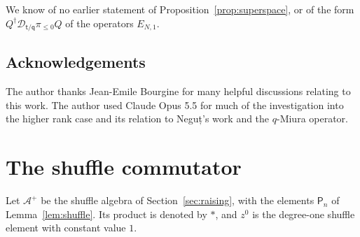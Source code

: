 \documentclass[11pt]{amsart}
\theoremstyle{definition}
\theoremstyle{remark}
\newcommand{\Mq}{\mathsf q}                      %
\newcommand{\Mt}{\mathsf t}                      %
\newcommand{\DD}{\mathcal D}
\newcommand{\Twist}[1]{\DD_{#1}}                 %
\newcommand{\pile}{\pi_{\leq0}}                  %
\newcommand{\Shuf}{\mathcal A^{+}}               %
\newcommand{\Qcr}{Q}                             %
\newcommand{\Qan}{Q^\dagger}                     %
\newcommand{\Negut}{Neguț}
\begin{document}
We know of no earlier
statement of Proposition~\ref{prop:superspace}, or of the form \(\Qan\Twist{\Mt/\Mq}\pile\Qcr\) of the operators
\(E_{N,1}\).

\subsection*{Acknowledgements}
The author thanks Jean-Emile Bourgine for many helpful discussions
relating to this work. The author used Claude Opus 5.5 for much of the
investigation into the higher rank case and its relation to \Negut's work and
the \(q\)-Miura operator.

\appendix
\section{The shuffle commutator}\label{sec:shuffleproof}

Let \(\Shuf\) be the shuffle algebra of Section~\ref{sec:raising}, with the
elements \(\mathsf P_n\) of Lemma~\ref{lem:shuffle}. Its product is denoted by
\(*\), and \(z^0\) is the degree-one shuffle element with constant value \(1\).
\end{document}
